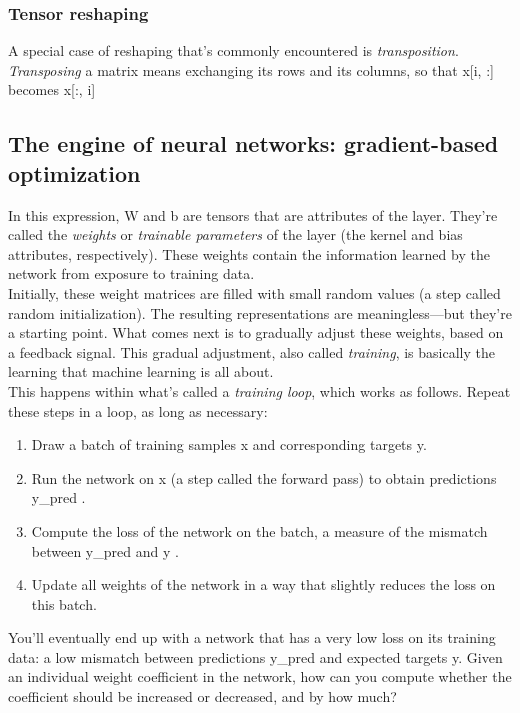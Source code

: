 \documentclass{article}
\numberwithin{equation}{section} %
\begin{document}
\subsubsection{Tensor reshaping}

A special case of reshaping that’s commonly encountered is \textit{transposition}. \textit{Transposing} a matrix means exchanging its rows and its columns, so that x[i, :] becomes x[:, i] \\

\subsection{The engine of neural networks: gradient-based optimization}

In this expression, W and b are tensors that are attributes of the layer. They’re called the \textit{weights} or \textit{trainable parameters} of the layer (the kernel and bias attributes, respectively). These weights contain the information learned by the network from exposure to training data. \\

Initially, these weight matrices are filled with small random values (a step called random initialization). The resulting representations are meaningless—but they’re a starting point. What comes next is to gradually adjust these weights, based on a feedback signal. This gradual adjustment, also called \textit{training}, is basically the learning that machine learning is all about. \\

This happens within what’s called a \textit{training loop}, which works as follows. Repeat these steps in a loop, as long as necessary:

\begin{enumerate}
	\item Draw a batch of training samples x and corresponding targets y.
	\item Run the network on x (a step called the forward pass) to obtain predictions y\_pred .
	\item Compute the loss of the network on the batch, a measure of the mismatch
	between y\_pred and y .
	\item Update all weights of the network in a way that slightly reduces the loss on this batch.
\end{enumerate}

You’ll eventually end up with a network that has a very low loss on its training data: a low mismatch between predictions y\_pred and expected targets y. Given an individual weight coefficient in the network, how can you compute whether the coefficient should be increased or decreased, and by how much? \\
\end{document}
